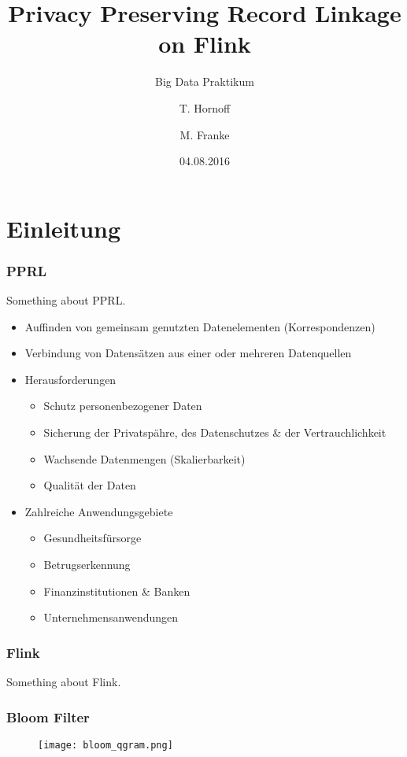 \documentclass{beamer}
\title{Privacy Preserving Record Linkage on Flink}
\subtitle{Big Data Praktikum}
\author{T. Hornoff \and M. Franke}
\institute{Universität Leipzig \\ Abteilung Datenbanken}
\date{04.08.2016}
\begin{document}
	\frame{\titlepage}

	\section[Section]{Einleitung}
    
    \begin{frame}
    		\frametitle{PPRL}
         Something about PPRL.
         
         \begin{itemize}
         		\item Auffinden von gemeinsam genutzten Datenelementen (Korrespondenzen)
         		\item Verbindung von Datensätzen aus einer oder mehreren Datenquellen
         		\item Herausforderungen
                \begin{itemize}
                    \item Schutz personenbezogener Daten
                    \item Sicherung der Privatspähre, des Datenschutzes \& der Vertrauchlichkeit
                    \item Wachsende Datenmengen (Skalierbarkeit)
                    \item Qualität der Daten
                \end{itemize}
         		\item Zahlreiche Anwendungsgebiete
                \begin{itemize}
                    \item Gesundheitsfürsorge
                    \item Betrugserkennung
                    \item Finanzinstitutionen \& Banken
                    \item Unternehmensanwendungen
                \end{itemize}
         \end{itemize}
    \end{frame}
    
    \begin{frame}
    		\frametitle{Flink}
        	Something about Flink.
    \end{frame}

	\begin{frame}
    		\frametitle{Bloom Filter}
            \begin{figure}[H]
                \texttt{[image: bloom\_qgram.png]}
            \end{figure}
    \end{frame}
    
\end{document}
